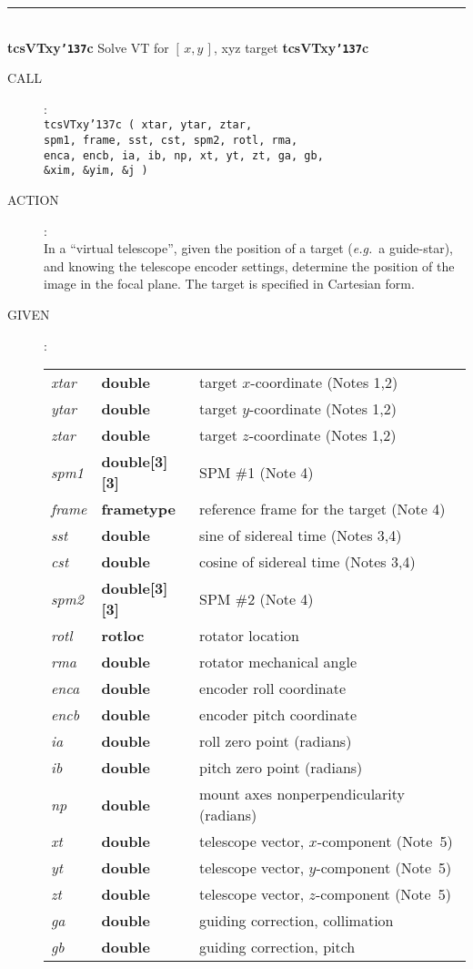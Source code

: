 \documentclass[12pt,fleqn,twoside]{article}
\renewcommand{\_}{{\tt\char'137}}     %
\newcommand{\xy}        {$[\,x,y\,]$}
\newcommand{\routine}[2]
{
  \newpage
  \rule{\textwidth}{0.3mm}\\ \nopagebreak
  {\Large {\bf #1} \hfill #2 \hfill {\bf #1}}
  \vspace{-1ex}
}
\newcommand{\call}[1]
{
  \goodbreak
  \begin{description}
    \item[CALL]: \\[0.5ex] \nopagebreak
        {\tt #1}
  \end{description}
  \vspace{-3ex}
}
\newcommand{\action}[1]
{
  \goodbreak
  \begin{description}
    \item[ACTION]: \\[0.5ex] \nopagebreak
        #1
  \end{description}
  \vspace{-3ex}
}
\newcommand{\args}[2]
{
  \goodbreak
  \begin{description}
  \item[#1]: \\[1.5ex] \nopagebreak
    \hspace*{-0.9em}
    \begin{tabular}{p{4.5em}p{5.8em}p{23.5em}}
      #2
    \end{tabular}
  \end{description}
  \vspace{-3ex}
}
\newcommand{\spec}[3]
{
  {\em {#1}} & {\bf \mbox{#2}} & {#3}
}
\begin{document}
\routine{tcsVTxy\_c}{Solve VT for \xy, xyz target}
\label{tcsVTxy_c}
\call{tcsVTxy\_c ( xtar, ytar, ztar, \\
\hspace*{5.5em} spm1, frame, sst, cst, spm2, rotl, rma, \\
\hspace*{5.5em} enca, encb, ia, ib, np, xt, yt, zt, ga, gb, \\
\hspace*{5.5em} \&xim, \&yim, \&j ) }
\action{In a ``virtual telescope'', given the
        position of a target ({\it e.g.}~a
        guide-star), and knowing the telescope encoder settings, determine
        the position of the image in the focal plane.
        The target is specified in Cartesian form.}
\args{GIVEN}
{
\spec{xtar}{double}{target $x$-coordinate (Notes 1,2)} \\
\spec{ytar}{double}{target $y$-coordinate (Notes 1,2)} \\
\spec{ztar}{double}{target $z$-coordinate (Notes 1,2)} \\
\spec{spm1}{double[3][3]}{SPM \#1 (Note 4)} \\
\spec{frame}{{\sc frametype}}{reference frame for the target (Note 4)} \\
\spec{sst}{double}{sine of sidereal time (Notes 3,4)} \\
\spec{cst}{double}{cosine of sidereal time (Notes 3,4)} \\
\spec{spm2}{double[3][3]}{SPM \#2 (Note 4)} \\
\spec{rotl}{{\sc rotloc}}{rotator location} \\
\spec{rma}{double}{rotator mechanical angle} \\
\spec{enca}{double}{encoder roll coordinate } \\
\spec{encb}{double}{encoder pitch coordinate} \\
\spec{ia}{double}{roll zero point (radians)} \\
\spec{ib}{double}{pitch zero point (radians)} \\
\spec{np}{double}{mount axes nonperpendicularity (radians)} \\
\spec{xt}{double}{telescope vector, $x$-component (Note~5)} \\
\spec{yt}{double}{telescope vector, $y$-component (Note~5)} \\
\spec{zt}{double}{telescope vector, $z$-component (Note~5)} \\
\spec{ga}{double}{guiding correction, collimation} \\
\spec{gb}{double}{guiding correction, pitch}
}
\end{document}
